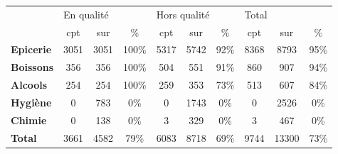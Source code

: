 \begin{tabular}{|l|ccc|ccc|ccc|}
\toprule
{} & \multicolumn{3}{l}{En qualité} & \multicolumn{3}{l}{Hors qualité} & \multicolumn{3}{l}{Total} \\
{} &        cpt &  sur &    \% &          cpt &  sur &   \% &   cpt &   sur &   \% \\
\midrule
\textbf{Epicerie} &       3051 & 3051 & 100\% &         5317 & 5742 & 92\% &  8368 &  8793 & 95\% \\
\textbf{Boissons} &        356 &  356 & 100\% &          504 &  551 & 91\% &   860 &   907 & 94\% \\
\textbf{Alcools } &        254 &  254 & 100\% &          259 &  353 & 73\% &   513 &   607 & 84\% \\
\textbf{Hygiène } &          0 &  783 &   0\% &            0 & 1743 &  0\% &     0 &  2526 &  0\% \\
\textbf{Chimie  } &          0 &  138 &   0\% &            3 &  329 &  0\% &     3 &   467 &  0\% \\
\textbf{Total   } &       3661 & 4582 &  79\% &         6083 & 8718 & 69\% &  9744 & 13300 & 73\% \\
\bottomrule
\end{tabular}
